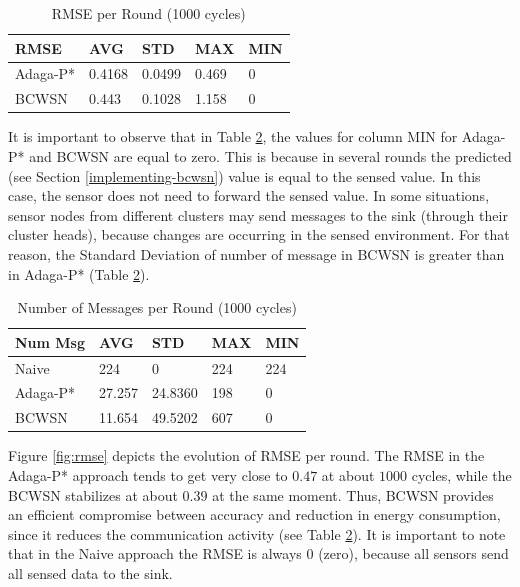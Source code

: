 \documentclass{acm_proc_article-sp}
\begin{document}
\begin{table}[h!]
\small
\caption{RMSE per Round (1000 cycles)}
\label{tab:rmse}
\begin{center}
\begin{tabular}{|l||l|l|l|l|}
\hline
RMSE &AVG &STD &MAX &MIN \\
\hline\hline
Adaga-P* &0.4168 &0.0499 &0.469 &0 \\
\hline
BCWSN &0.443 &0.1028 &1.158 &0 \\
\hline
\end{tabular}
\end{center}
\end{table}

It is important to observe that in Table \ref{tab:num-msg}, the values for
column MIN for Adaga-P* and BCWSN are equal to zero. This is because in several
rounds the predicted (see Section \ref{implementing-bcwsn}) value is equal to
the sensed value. In this case, the sensor does not need to forward the sensed
value. In some situations, sensor nodes from different clusters may send 
messages to the sink (through their cluster heads), because changes are
occurring in the sensed environment. For that reason, the Standard Deviation of
number of message in BCWSN is greater than in Adaga-P* (Table
\ref{tab:num-msg}).

\begin{table}[h!]
\small
\caption{Number of Messages per Round (1000 cycles)}
\label{tab:num-msg}
\begin{center}
\begin{tabular}{|l||l|l|l|l|}
\hline
Num Msg &AVG &STD &MAX &MIN \\
\hline\hline
Naive &224 &0 &224 &224 \\
\hline
Adaga-P* &27.257 &24.8360 &198 &0 \\
\hline
BCWSN &11.654 &49.5202 &607 &0 \\
\hline
\end{tabular}
\end{center}
\end{table}
\vspace*{-.3cm}


Figure \ref{fig:rmse} depicts the evolution of RMSE per round. The RMSE in the
Adaga-P* approach tends to get very close to $0.47$ at about $1000$ cycles,
while the BCWSN stabilizes at about $0.39$ at the same moment. Thus, BCWSN
provides an efficient compromise between accuracy and reduction in energy
consumption, since it reduces the communication activity (see Table
\ref{tab:num-msg}). It is important to note that in the Naive approach the RMSE
is always 0 (zero), because all sensors send all sensed data to the sink.
\vspace*{-.3cm}
\end{document}
